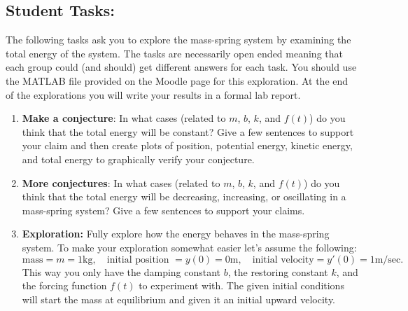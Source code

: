 \subsection*{Student Tasks:}
The following tasks ask you to explore the mass-spring system by examining the total
energy of the system.  The tasks are necessarily open ended meaning that each group could
(and should) get different answers for each task.  You should use the MATLAB file provided
on the Moodle page for this exploration.  At the end of the explorations you will
write your results in a formal lab report.
\begin{enumerate}
    \item {\bf Make a conjecture}:  In what cases (related to $m$, $b$, $k$, and $f(t)$) do
        you think that the total energy will be constant? Give a few sentences to support
        your claim and then create plots of position, potential energy, kinetic energy,
        and total energy to graphically verify your conjecture. 

    \item {\bf More conjectures}:  In what cases (related to $m$, $b$, $k$, and $f(t)$) do
        you think that the total energy will be decreasing, increasing, or
        oscillating in a mass-spring system? Give a few sentences to support your claims.



    \item {\bf Exploration:} Fully explore how the energy behaves in the mass-spring
        system.  To make your exploration somewhat easier let's assume the following:
        \[ \text{mass}=m=1\text{kg}, \quad \text{initial position }=y(0) = 0\text{m}, \quad \text{initial
        velocity}=y'(0)=1\text{m/sec}. \]
        This way you only have the damping constant $b$, the restoring constant $k$, and
        the forcing function $f(t)$ to experiment with.  The given initial conditions will
        start the mass at equilibrium and given it an initial upward velocity.


\end{enumerate}
